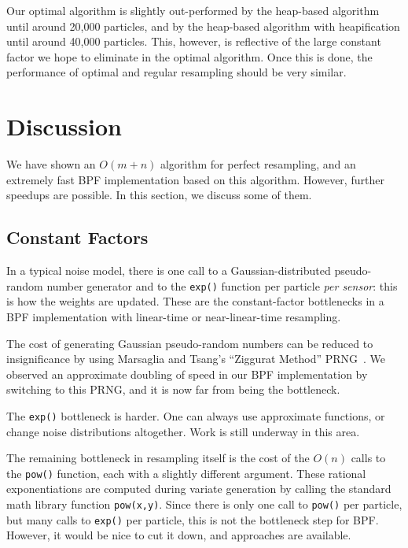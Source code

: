 \documentclass[12pt]{article}
\begin{document}
  Our optimal algorithm is slightly out-performed by the
  heap-based algorithm until around 20,000 particles, and by
  the heap-based algorithm with heapification until around
  40,000 particles.  This, however, is reflective of the
  large constant factor we hope to eliminate in the optimal
  algorithm.  Once this is done, the performance of optimal
  and regular resampling should be very similar.

\section{Discussion}

  We have shown an $O(m + n)$ algorithm for perfect
  resampling, and an extremely fast BPF implementation based
  on this algorithm.  However, further speedups are
  possible.  In this section, we discuss some of them.

\subsection{Constant Factors}

  In a typical noise model, there is one call
  to a Gaussian-distributed pseudo-random number generator
  and to the {\tt exp()} function per particle {\em per
  sensor}: this is how the weights are updated.  These are the
  constant-factor bottlenecks in a BPF implementation with
  linear-time or near-linear-time resampling.

  The cost of generating Gaussian pseudo-random numbers can
  be reduced to insignificance by using Marsaglia and
  Tsang's ``Ziggurat Method'' PRNG~\cite{ziggurat}.  We
  observed an approximate doubling of speed in our BPF
  implementation by switching to this PRNG, and it is now
  far from being the bottleneck.

  The {\tt exp()} bottleneck is harder.  One can always use
  approximate functions, or change noise distributions
  altogether.  Work is still underway in this area.

  The remaining bottleneck in resampling itself is the cost
  of the $O(n)$ calls to the {\tt pow()} function, each with
  a slightly different argument.  These rational
  exponentiations are computed during variate generation by
  calling the standard math library function {\tt pow(x,y)}.
  Since there is only one call to {\tt pow()} per particle,
  but many calls to {\tt exp()} per particle, this is not
  the bottleneck step for BPF.  However, it would be nice to
  cut it down, and approaches are available.
\end{document}
